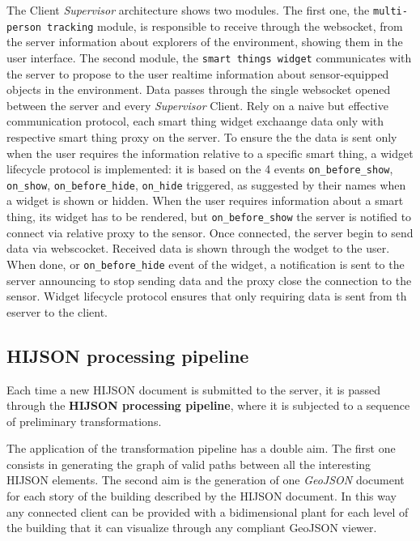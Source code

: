 \documentclass[]{article}
\begin{document}
The Client \emph{Supervisor} architecture shows two modules. The first
one, the \texttt{multi-person\ tracking} module, is responsible to
receive through the websocket, from the server information about
explorers of the environment, showing them in the user interface. The
second module, the \texttt{smart\ things\ widget} communicates with the
server to propose to the user realtime information about sensor-equipped
objects in the environment. Data passes through the single websocket
opened between the server and every \emph{Supervisor} Client. Rely on a
naive but effective communication protocol, each smart thing widget
exchaange data only with respective smart thing proxy on the server. To
ensure the the data is sent only when the user requires the information
relative to a specific smart thing, a widget lifecycle protocol is
implemented: it is based on the 4 events \texttt{on\_before\_show},
\texttt{on\_show}, \texttt{on\_before\_hide}, \texttt{on\_hide}
triggered, as suggested by their names when a widget is shown or hidden.
When the user requires information about a smart thing, its widget has
to be rendered, but \texttt{on\_before\_show} the server is notified to
connect via relative proxy to the sensor. Once connected, the server
begin to send data via webscocket. Received data is shown through the
wodget to the user. When done, or \texttt{on\_before\_hide} event of the
widget, a notification is sent to the server announcing to stop sending
data and the proxy close the connection to the sensor. Widget lifecycle
protocol ensures that only requiring data is sent from th eserver to the
client.

\subsection{HIJSON processing
pipeline}\label{hijson-processing-pipeline}

Each time a new HIJSON document is submitted to the server, it is passed
through the \textbf{HIJSON processing pipeline}, where it is subjected
to a sequence of preliminary transformations.

The application of the transformation pipeline has a double aim. The
first one consists in generating the graph of valid paths between all
the interesting HIJSON elements. The second aim is the generation of one
\emph{GeoJSON} document for each story of the building described by the
HIJSON document. In this way any connected client can be provided with a
bidimensional plant for each level of the building that it can visualize
through any compliant GeoJSON viewer.
\end{document}
